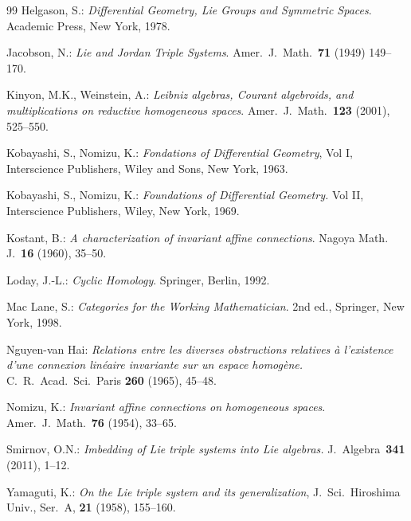 \documentclass [11pt] {article}
\theoremstyle{definition}
\begin{document}
\begin{small}
\begin{thebibliography}{99}
 Helgason, S.: \textit{Differential Geometry, Lie Groups and Symmetric Spaces}.
      Academic Press, New York, 1978.
       


 Jacobson, N.: \textit{Lie and Jordan Triple Systems}. 
Amer.~J.~Math.~\textbf{71} (1949) 149--170.
       

 Kinyon, M.K., Weinstein, A.: \textit{Leibniz algebras, Courant algebroids, and multiplications on reductive homogeneous spaces}.
 Amer.~J.~Math.~\textbf{123} (2001), 525--550.


  Kobayashi, S., Nomizu, K.: 
  \textit{Fondations of Differential Geometry},
Vol I, Interscience Publishers, Wiley and Sons, New York, 1963.

  Kobayashi, S., Nomizu, K.: 
  \textit{Foundations of Differential
    Geometry.} Vol II, Interscience Publishers, Wiley, New York, 1969.

  Kostant, B.: \textit{A characterization of invariant affine connections}. Nagoya Math. J.~\textbf{16} (1960), 35--50.
 
 Loday, J.-L.: \textit{Cyclic Homology}. Springer, Berlin, 1992.
     
 Mac Lane, S.: \textit{Categories for the Working Mathematician}. 
      2nd ed., Springer, New York, 1998.
      

      


 Nguyen-van Hai: \textit{Relations entre les diverses obstructions relatives \`{a} 
	l'existence d'une connexion lin\'{e}aire invariante sur un espace homog\`{e}ne.}
C.~R.~Acad.~Sci.~Paris \textbf{260} (1965), 45--48.

 Nomizu, K.: \textit{Invariant affine connections on homogeneous spaces}. Amer.~J.~Math.~\textbf{76} (1954), 33--65.
     
     

 Smirnov, O.N.: \textit{Imbedding of Lie triple systems into Lie algebras.} 
J.~Algebra~\textbf{341} (2011), 1--12.

 Yamaguti, K.: 
\textit{On the Lie triple system and its generalization},
J.~Sci.~Hiroshima Univ., Ser.~A, 
\textbf{21} (1958), 155--160.

\end{thebibliography}

\end{small}
\end{document}
